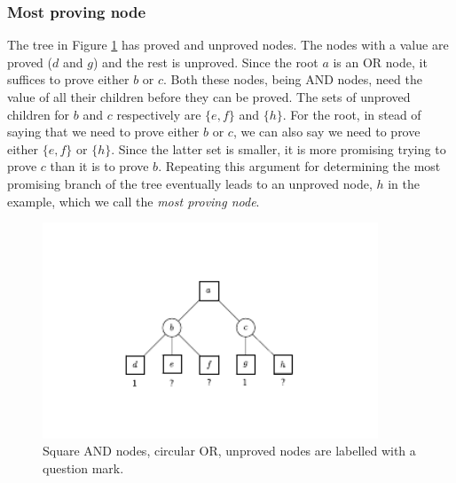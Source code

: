 \documentclass{article}
\begin{document}
\subsubsection*{Most proving node}
The tree in Figure \ref{tree:pnex} has proved and unproved nodes. The nodes with a value are proved ($d$ and $g$) and the rest is unproved.
Since the root $a$ is an OR node, it suffices
to prove either $b$ or $c$. Both these nodes, being AND nodes, need the value of all their children before they can be proved. The sets of
unproved children for $b$ and $c$ respectively are $\{e, f\}$ and $\{h\}$. For the root, in stead of saying that we need to prove
either $b$ or $c$, we can also say we need to prove either $\{e, f\}$ or $\{h\}$. Since the latter set is smaller, it is more
promising trying to prove $c$ than it is to prove $b$. Repeating this argument for determining the most promising branch of the tree
eventually leads to an unproved node, $h$ in the example, which we call the \textit{most proving node}.\\

\begin{figure}[h]
\center
\includegraphics[width=10cm]{proofset.pdf}
\caption{Square AND nodes, circular OR, unproved nodes are labelled with a question mark.}
\label{tree:pnex}
\end{figure}
\end{document}
